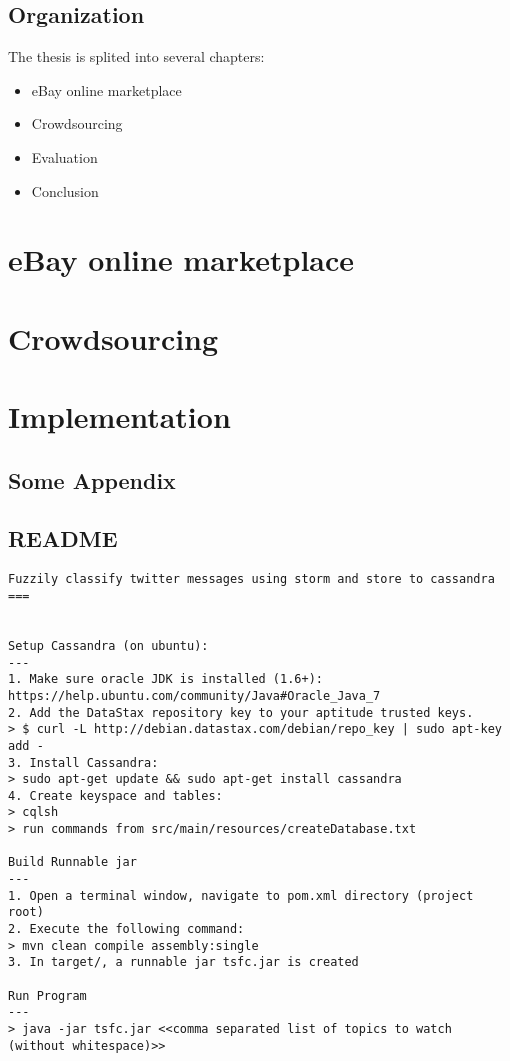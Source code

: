 \documentclass[a4paper]{report}
\begin{document}
\section{Organization}
The thesis is splited into several chapters:
\begin{itemize}
	\item eBay online marketplace
	\item Crowdsourcing
	\item Evaluation
	\item Conclusion
\end{itemize}

\chapter{eBay online marketplace}
\minitoc


\chapter{Crowdsourcing}
\minitoc


\chapter{Implementation}
\minitoc


\clearpage



\newpage
\begin{appendices}
\chapter{Some Appendix}


\section{README}
\begin{lstlisting}
Fuzzily classify twitter messages using storm and store to cassandra
===


Setup Cassandra (on ubuntu):
---
1. Make sure oracle JDK is installed (1.6+): https://help.ubuntu.com/community/Java#Oracle_Java_7
2. Add the DataStax repository key to your aptitude trusted keys.
> $ curl -L http://debian.datastax.com/debian/repo_key | sudo apt-key add -
3. Install Cassandra:
> sudo apt-get update && sudo apt-get install cassandra
4. Create keyspace and tables:
> cqlsh
> run commands from src/main/resources/createDatabase.txt

Build Runnable jar
---
1. Open a terminal window, navigate to pom.xml directory (project root)
2. Execute the following command:
> mvn clean compile assembly:single
3. In target/, a runnable jar tsfc.jar is created

Run Program
---
> java -jar tsfc.jar <<comma separated list of topics to watch (without whitespace)>>
\end{lstlisting}

\end{appendices}
\end{document}
